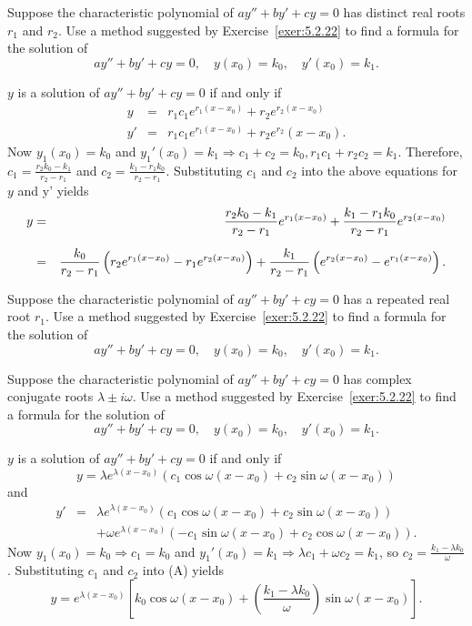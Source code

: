 \documentclass{ximera}
\begin{document}
\begin{problem}\label{exer:5.2.30}
Suppose the characteristic polynomial of $ay''+by'+cy=0$
 has distinct real roots $r_1$ and $r_2$. Use a method suggested
by Exercise~\ref{exer:5.2.22}  to find a formula for the solution
of
$$
ay''+by'+cy=0, \quad  y(x_0)=k_0,\quad y'(x_0)=k_1.
$$
\begin{solution}
$y$ is a solution of $ay''+by'+cy=0$  if and only if
\begin{eqnarray*}
y&=&r_1 c_1e^{r_1(x-x_0)}+r_2 e^{r_2(x-x_0)}\\
y'&=&r_1c_1e^{r_1(x-x_0)}+r_2e^{r_2}(x-x_0).
\end{eqnarray*}
Now $y_1(x_0)=k_0$ and $y_1'(x_0)=k_1\Rightarrow c_1+c_2=k_0,
r_1c_1+r_2c_2=k_1$. Therefore,$c_1=\frac{r_2k_0-k_1}{r_2-r_1}$
and $c_2=\frac{k_1-r_1k_0}{r_2-r_1}$. Substituting $c_1$ and $c_2$
into  the above equations for $y$ and y' yields
\begin{eqnarray*}
y&=&\frac{r_2k_0-k_1}{r_2-r_1}e^{r_1(x-x_0)}+
\frac{k_1-r_1k_0}{r_2-r_1}e^{r_2(x-x_0)}\\[2\jot]
&=&\frac{k_0}{r_2-r_1}\left(r_2e^{r_1(x-x_0)}-r_1e^{r_2(x-x_0)}\right)+\frac{k_1}{r_2-r_1} \left(e^{r_2(x-x_0)}-e^{r_1(x-x_0)}\right).
\end{eqnarray*}
\end{solution}
\end{problem}

\begin{problem}\label{exer:5.2.31}
Suppose the characteristic polynomial of $ay''+by'+cy=0$ has a
repeated real root $r_1$. Use a method suggested by
Exercise~\ref{exer:5.2.22} to find a formula for the solution of
$$
ay''+by'+cy=0, \quad  y(x_0)=k_0,\quad y'(x_0)=k_1.
$$
\end{problem}

\begin{problem}\label{exer:5.2.32}
Suppose the characteristic polynomial of $ay''+by'+cy=0$ has
complex conjugate roots $\lambda\pm i\omega$. Use a method suggested
by Exercise~\ref{exer:5.2.22} to find a formula for the solution of
$$
ay''+by'+cy=0, \quad  y(x_0)=k_0,\quad y'(x_0)=k_1.
$$
\begin{solution}
$y$ is a solution of $ay''+by'+cy=0$  if and only if
\begin{equation}
y=\lambda e^{\lambda(x-x_0)}\left(c_1\cos\omega(x-x_0)+c_2\sin\omega(x-x_0)\right)
\end{equation}
and
\begin{eqnarray*}
y'&=&\lambda
e^{\lambda(x-x_0)}\left(c_1\cos\omega(x-x_0)+c_2\sin\omega(x-x_0)\right)\\
&&
+\omega
e^{\lambda(x-x_0)}\left(-c_1\sin\omega(x-x_0)+c_2\cos\omega(x-x_0)\right).
\end{eqnarray*}
Now $y_1(x_0)=k_0\Rightarrow c_1=k_0$ and $y_1'(x_0)=k_1\Rightarrow
\lambda c_1+\omega c_2=k_1$,  so $c_2=\frac{k_1-\lambda
k_0}{\omega}$.
 Substituting $c_1$ and $c_2$
into
(A) yields
$$
y=e^{\lambda(x-x_0)}\left[k_0\cos\omega(x-x_0)+\left(\frac{k_1-\lambda k_0}{\omega}\right)\sin\omega(x-x_0)\right].
$$
\end{solution}
\end{problem}
\end{document}
